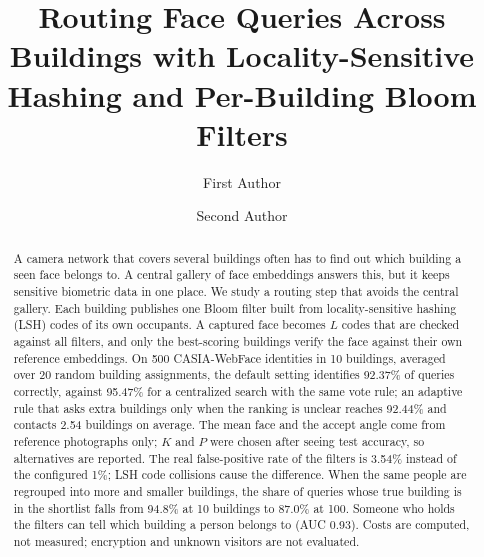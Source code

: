 \documentclass[runningheads]{llncs}
\begin{document}
%
\title{Routing Face Queries Across Buildings with Locality-Sensitive Hashing and Per-Building Bloom Filters}
%
%
\author{First Author \and Second Author}
%
%
%
\maketitle              %
%
\begin{abstract}
A camera network that covers several buildings often has to find out which building a seen face belongs to.
A central gallery of face embeddings answers this, but it keeps sensitive biometric data in one place. We study
a routing step that avoids the central gallery. Each building publishes one Bloom filter built from
locality-sensitive hashing (LSH) codes of its own occupants. A captured face becomes $L$ codes that are checked
against all filters, and only the best-scoring buildings verify the face against their own reference embeddings.
On 500 CASIA-WebFace identities in 10 buildings, averaged over 20 random building assignments, the default setting
identifies 92.37\% of queries correctly, against 95.47\% for a centralized search with the same vote rule;
an adaptive rule that asks extra buildings only when the ranking is unclear reaches 92.44\% and contacts
2.54 buildings on average. The mean face and the accept angle come from reference photographs only; $K$ and
$P$ were chosen after seeing test accuracy, so alternatives are reported. The real false-positive rate of the filters is 3.54\% instead of the configured 1\%; LSH code collisions
cause the difference. When the same people are regrouped into more and smaller buildings, the share of queries
whose true building is in the shortlist falls from 94.8\% at 10 buildings to 87.0\% at 100. Someone
who holds the filters can tell which building a person belongs to (AUC 0.93). Costs are computed, not measured; encryption and unknown visitors are not evaluated.

\end{abstract}
%
\end{document}
